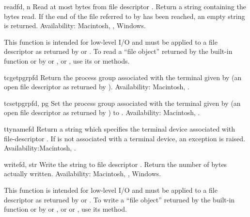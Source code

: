 \begin{funcdesc}{read}{fd, n}
Read at most  bytes from file descriptor .
Return a string containing the bytes read.  If the end of the file
referred to by  has been reached, an empty string is
returned.
Availability: Macintosh, \UNIX, Windows.

\begin{notice}
This function is intended for low-level I/O and must be applied
to a file descriptor as returned by  or
.  To read a ``file object'' returned by the
built-in function  or by  or
, or , use its
 or  methods.
\end{notice}
\end{funcdesc}

\begin{funcdesc}{tcgetpgrp}{fd}
Return the process group associated with the terminal given by
 (an open file descriptor as returned by ).
Availability: Macintosh, \UNIX.
\end{funcdesc}

\begin{funcdesc}{tcsetpgrp}{fd, pg}
Set the process group associated with the terminal given by
 (an open file descriptor as returned by )
to .
Availability: Macintosh, \UNIX.
\end{funcdesc}

\begin{funcdesc}{ttyname}{fd}
Return a string which specifies the terminal device associated with
file-descriptor .  If  is not associated with a terminal
device, an exception is raised.
Availability:Macintosh,  \UNIX.
\end{funcdesc}

\begin{funcdesc}{write}{fd, str}
Write the string  to file descriptor .
Return the number of bytes actually written.
Availability: Macintosh, \UNIX, Windows.

\begin{notice}
This function is intended for low-level I/O and must be applied
to a file descriptor as returned by  or
.  To write a ``file object'' returned by the
built-in function  or by  or
, or  or , use
its  method.
\end{notice}
\end{funcdesc}


